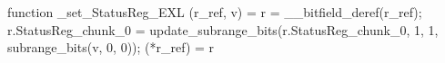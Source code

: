 function _set_StatusReg_EXL (r_ref, v) = {
    r = __bitfield_deref(r_ref);
    r.StatusReg_chunk_0 = update_subrange_bits(r.StatusReg_chunk_0, 1, 1, subrange_bits(v, 0, 0));
    (*r_ref) = r
}
